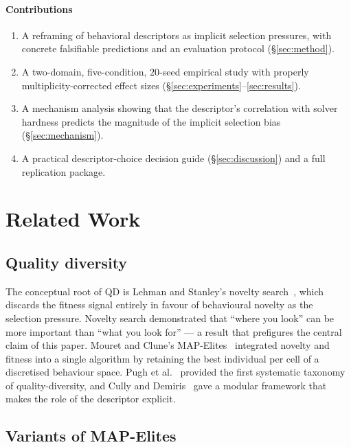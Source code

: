 \documentclass[conference]{IEEEtran}
\begin{document}
\paragraph{Contributions}
\begin{enumerate}
  \item A reframing of behavioral descriptors as implicit selection
        pressures, with concrete falsifiable predictions and an
        evaluation protocol (\S\ref{sec:method}).
  \item A two-domain, five-condition, $20$-seed empirical study with
        properly multiplicity-corrected effect sizes
        (\S\ref{sec:experiments}--\ref{sec:results}).
  \item A mechanism analysis showing that the descriptor's
        correlation with solver hardness predicts the magnitude of
        the implicit selection bias (\S\ref{sec:mechanism}).
  \item A practical descriptor-choice decision guide
        (\S\ref{sec:discussion}) and a full replication package.
\end{enumerate}

\section{Related Work}
\label{sec:related}

\subsection{Quality diversity}

The conceptual root of QD is Lehman and Stanley's novelty
search~\cite{lehman2011novelty}, which discards the fitness signal
entirely in favour of behavioural novelty as the selection
pressure. Novelty search demonstrated that ``where you look'' can be
more important than ``what you look for'' --- a result that prefigures
the central claim of this paper. Mouret and Clune's
MAP-Elites~\cite{mouret2015illuminating} integrated novelty and
fitness into a single algorithm by retaining the best individual per
cell of a discretised behaviour space. Pugh et al.\
\cite{pugh2016quality} provided the first systematic taxonomy of
quality-diversity, and Cully and Demiris~\cite{cully2017qd} gave a
modular framework that makes the role of the descriptor explicit.

\subsection{Variants of MAP-Elites}
\end{document}
